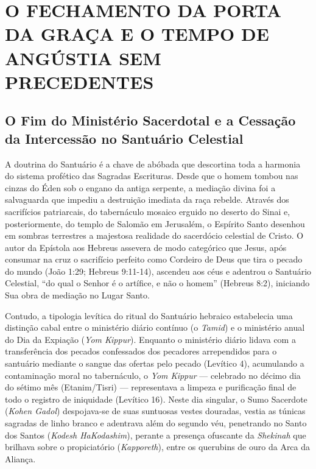\section{O FECHAMENTO DA PORTA DA GRAÇA E O TEMPO DE ANGÚSTIA SEM PRECEDENTES}



\subsection{O Fim do Ministério Sacerdotal e a Cessação da Intercessão no Santuário Celestial}


A doutrina do Santuário é a chave de abóbada que descortina toda a harmonia do sistema profético das Sagradas Escrituras. Desde que o homem tombou nas cinzas do Éden sob o engano da antiga serpente, a mediação divina foi a salvaguarda que impediu a destruição imediata da raça rebelde. Através dos sacrifícios patriarcais, do tabernáculo mosaico erguido no deserto do Sinai e, posteriormente, do templo de Salomão em Jerusalém, o Espírito Santo desenhou em sombras terrestres a majestosa realidade do sacerdócio celestial de Cristo. O autor da Epístola aos Hebreus assevera de modo categórico que Jesus, após consumar na cruz o sacrifício perfeito como Cordeiro de Deus que tira o pecado do mundo (João 1:29; Hebreus 9:11-14), ascendeu aos céus e adentrou o Santuário Celestial, ``do qual o Senhor é o artífice, e não o homem'' (Hebreus 8:2), iniciando Sua obra de mediação no Lugar Santo.

Contudo, a tipologia levítica do ritual do Santuário hebraico estabelecia uma distinção cabal entre o ministério diário contínuo (o \textit{Tamid}) e o ministério anual do Dia da Expiação (\textit{Yom Kippur}). Enquanto o ministério diário lidava com a transferência dos pecados confessados dos pecadores arrependidos para o santuário mediante o sangue das ofertas pelo pecado (Levítico 4), acumulando a contaminação moral no tabernáculo, o \textit{Yom Kippur} — celebrado no décimo dia do sétimo mês (Etanim/Tisri) — representava a limpeza e purificação final de todo o registro de iniquidade (Levítico 16). Neste dia singular, o Sumo Sacerdote (\textit{Kohen Gadol}) despojava-se de suas suntuosas vestes douradas, vestia as túnicas sagradas de linho branco e adentrava além do segundo véu, penetrando no Santo dos Santos (\textit{Kodesh HaKodashim}), perante a presença ofuscante da \textit{Shekinah} que brilhava sobre o propiciatório (\textit{Kapporeth}), entre os querubins de ouro da Arca da Aliança.

